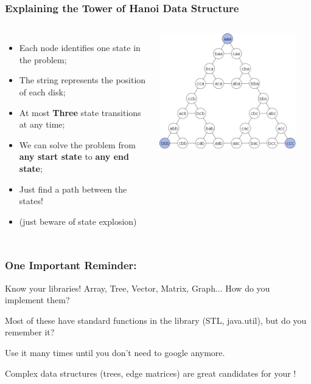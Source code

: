 \documentclass{beamer}
\begin{document}
\begin{frame}
  \frametitle{Explaining the Tower of Hanoi Data Structure}
  \begin{columns}[c]
    {\small
    \begin{itemize}
    \item Each node identifies one state in the problem;
    \item The string represents the position of each disk;
    \item At most {\bf Three} state transitions at any time;
    \item We can solve the problem from {\bf any start state} to {\bf
      any end state};
    \item Just find a path between the states!
    \item (just beware of state explosion)      
    \end{itemize}
    }
    \includegraphics[width=0.9\textwidth]{img/hanoi_graph}
    \vfill
  \end{columns}
\end{frame}

\begin{frame}
  \frametitle{One Important Reminder:}

  \begin{block}{Know your libraries!}
    Array, Tree, Vector, Matrix, Graph... How do you implement them?

    \bigskip

    Most of these have standard functions in the library (STL,
    java.util), but do you remember it?

    \bigskip

    Use it many times until you don't need to google anymore.
  \end{block}

  \vfill
  
  \begin{exampleblock}{}
    Complex data structures (trees, edge matrices) are great
    candidates for your !
  \end{exampleblock}
\end{frame}
\end{document}
